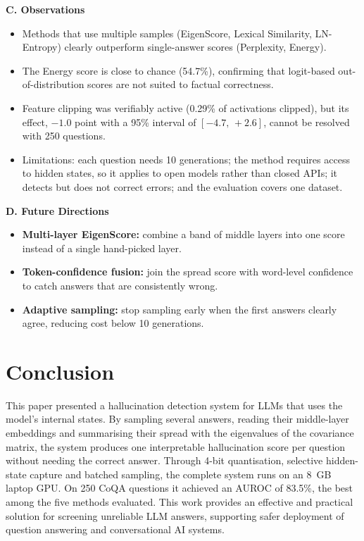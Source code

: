 \documentclass[journal]{IEEEtran}
\begin{document}
\noindent\textbf{C. Observations}
\begin{itemize}
\item Methods that use multiple samples (EigenScore, Lexical Similarity, LN-Entropy) clearly outperform single-answer scores (Perplexity, Energy).
\item The Energy score is close to chance (54.7\%), confirming that logit-based out-of-distribution scores are not suited to factual correctness.
\item Feature clipping was verifiably active (0.29\% of activations clipped), but its effect, $-1.0$ point with a 95\% interval of $[-4.7,\,+2.6]$, cannot be resolved with 250 questions.
\item Limitations: each question needs 10 generations; the method requires access to hidden states, so it applies to open models rather than closed APIs; it detects but does not correct errors; and the evaluation covers one dataset.
\end{itemize}

\noindent\textbf{D. Future Directions}
\begin{itemize}
\item \textbf{Multi-layer EigenScore:} combine a band of middle layers into one score instead of a single hand-picked layer.
\item \textbf{Token-confidence fusion:} join the spread score with word-level confidence to catch answers that are consistently wrong.
\item \textbf{Adaptive sampling:} stop sampling early when the first answers clearly agree, reducing cost below 10 generations.
\end{itemize}

\section{Conclusion}
This paper presented a hallucination detection system for LLMs that uses the model's internal states. By sampling several answers, reading their middle-layer embeddings and summarising their spread with the eigenvalues of the covariance matrix, the system produces one interpretable hallucination score per question without needing the correct answer. Through 4-bit quantisation, selective hidden-state capture and batched sampling, the complete system runs on an 8~GB laptop GPU. On 250 CoQA questions it achieved an AUROC of 83.5\%, the best among the five methods evaluated. This work provides an effective and practical solution for screening unreliable LLM answers, supporting safer deployment of question answering and conversational AI systems.
\end{document}
